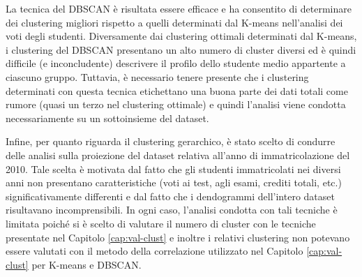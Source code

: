 \documentclass[12pt]{article}
\begin{document}
La tecnica del DBSCAN è risultata essere efficace e ha consentito di determinare dei clustering migliori rispetto a quelli determinati dal K-means nell'analisi dei voti degli studenti. 
Diversamente dai clustering ottimali determinati dal K-means, i clustering del DBSCAN presentano un alto numero di cluster diversi ed è quindi difficile (e inconcludente) descrivere il profilo dello studente medio appartente a ciascuno gruppo. 
Tuttavia, è necessario tenere presente che i clustering determinati con questa tecnica etichettano una buona parte dei dati totali come rumore (quasi un terzo nel clustering ottimale) e quindi l'analisi viene condotta necessariamente su un sottoinsieme del dataset. 

Infine, per quanto riguarda il clustering gerarchico, è stato scelto di condurre delle analisi sulla proiezione del dataset relativa all'anno di imma\-tricolazione del 2010. 
Tale scelta è motivata dal fatto che gli studenti imma\-tricolati nei diversi anni non presentano caratteristiche (voti ai test, agli esami, crediti totali, etc.) significativamente differenti e dal fatto che i dendogrammi dell'intero dataset risultavano incomprensibili. 
In ogni caso, l'analisi condotta con tali tecniche è limitata poiché si è scelto di valutare il numero di cluster con le tecniche presentate nel Capitolo \ref{cap:val-clust} e inoltre i relativi clustering non potevano essere valutati con il metodo della correlazione utilizzato nel Capitolo \ref{cap:val-clust} per K-means e DBSCAN.
\newpage 

\listoffigures
 
\newpage


\listoftables

\newpage

\end{document}
